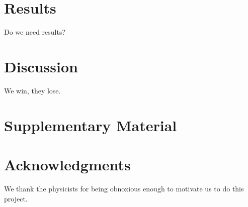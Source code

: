 \documentclass[11pt]{article}
\begin{document}
\section*{Results\label{sec:results}}

Do we need results?

\section*{Discussion\label{sec:discussion}}

We win, they lose.

\section*{Supplementary Material}



\section*{Acknowledgments}
We thank the physicists for being obnoxious enough to motivate us to do this project.



\end{document}
